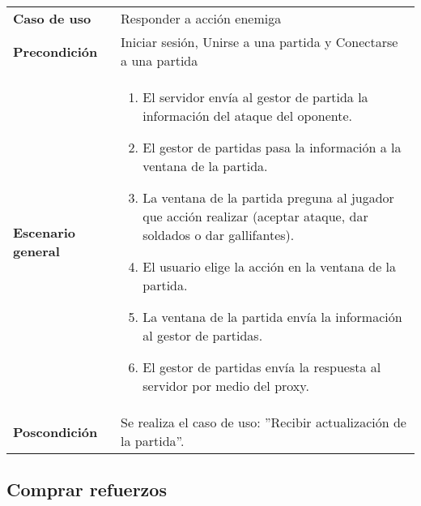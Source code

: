 {\footnotesize
\begin{tabularx}{0.95\textwidth}{p{}|X}

\textbf{Caso de uso} & Responder a acción enemiga \\

\textbf{Precondición} & Iniciar sesión, Unirse a una partida y Conectarse a una
partida \\

\textbf{Escenario general} & \begin{enumerate}
\item El servidor envía al gestor de partida la información del ataque del
oponente.
\item El gestor de partidas pasa la información a la ventana de la partida.
\item La ventana de la partida preguna al jugador que acción realizar (aceptar
ataque, dar soldados o dar gallifantes).
\item El usuario elige la acción en la ventana de la partida.
\item La ventana de la partida envía la información al gestor de partidas.
\item El gestor de partidas envía la respuesta al servidor por medio del proxy.

\end{enumerate} \\

\textbf{Poscondición} & Se realiza el caso de uso: ''Recibir actualización de la
partida''.

\end{tabularx}
}

\subsection{Comprar refuerzos}

